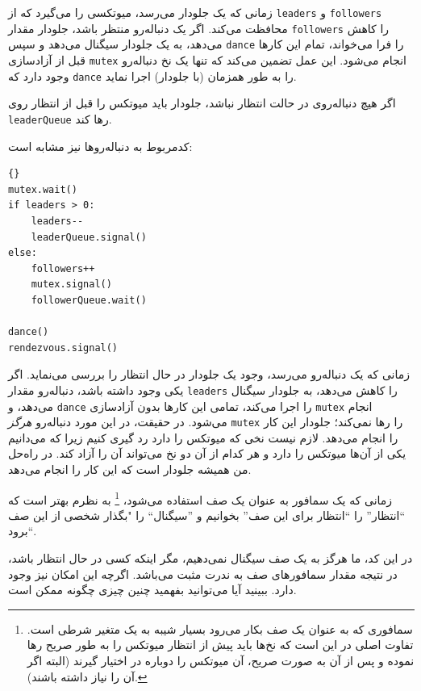 \documentclass{book}
\begin{document}
    زمانی که یک جلو‌دار می‌رسد، میوتکسی را می‌گیرد که از \texttt{leaders} و \texttt{followers} محافظت می‌کند.
    اگر یک دنباله‌رو منتظر باشد، جلو‌دار مقدار {\tt followers} را کاهش می‌دهد،  به یک جلو‌دار سیگنال می‌دهد و سپس {\tt dance} را فرا می‌خواند، 
    تمام این‌ کارها  قبل از آزادسازی \texttt{mutex} انجام می‌شود. 
    این عمل تضمین می‌کند که تنها یک نخ دنباله‌رو وجود دارد که \texttt{dance} را به طور همزمان (با جلودار) اجرا نماید. 
    
    اگر هیچ دنباله‌روی در حالت انتظار نباشد، جلو‌دار باید میوتکس را قبل از انتظار روی \texttt{leaderQueue} رها کند. 

    کدمربوط به دنباله‌روها نیز مشابه است:

\begin{latin}
\begin{lstlisting}[title=\rl{راه‌حل صف (دنباله‌روها)}]{}
mutex.wait()
if leaders > 0:
    leaders--
    leaderQueue.signal()
else:
    followers++
    mutex.signal()
    followerQueue.wait()    

dance()
rendezvous.signal()
\end{lstlisting}
\end{latin}
    زمانی که یک دنباله‌رو می‌رسد، وجود یک جلودار در حال انتظار را بررسی می‌نماید. 
    اگر یکی وجود داشته باشد، دنباله‌رو مقدار {\tt leaders} را کاهش می‌دهد، به جلودار سیگنال می‌دهد، و {\tt dance} را اجرا می‌کند، 
    تمامی این‌ کارها بدون آزادسازی \texttt{mutex} انجام می‌شود. 
    در حقیقت، در این مورد دنباله‌رو {\em هرگز} {\tt mutex} را رها نمی‌کند؛‌ جلودار این کار را انجام می‌دهد. 
    لازم نیست نخی که میوتکس را دارد رد گیری کنیم زیرا که می‌دانیم یکی از آن‌ها میوتکس را دارد و هر کدام از آن دو نخ می‌تواند آن را آزاد کند. 
    در راه‌حل من همیشه جلودار است که این کار را انجام می‌دهد. 
    
    زمانی که یک سمافور به عنوان یک صف استفاده می‌شود،%
\footnote{
    سمافوری که به عنوان یک صف بکار می‌رود بسیار شیبه به یک متغیر شرطی است. تفاوت اصلی در این است که نخ‌ها باید پیش از انتظار میوتکس را به طور صریح
     رها نموده و پس از آن به صورت صریح، آن میوتکس را دوباره در اختیار گیرند (البته اگر آن را نیاز داشته باشند). }
    به نظرم بهتر است که ``انتظار'' را ``انتظار برای این صف'' بخوانیم و ''سیگنال`` را  "بگذار شخصی از این صف برود``.
    
    در این کد، ما هرگز به یک صف سیگنال نمی‌دهیم، مگر اینکه کسی در حال انتظار باشد، 
    در نتیجه مقدار سمافور‌های صف به ندرت مثبت می‌باشد. اگرچه این امکان نیز وجود دارد. 
    ببینید آیا می‌توانید بفهمید چنین چیزی چگونه ممکن است.
\end{document}
